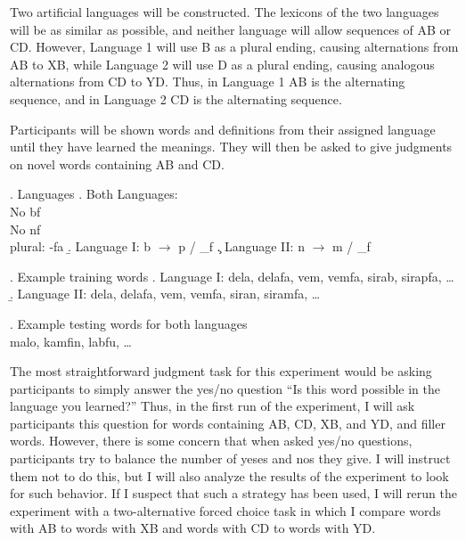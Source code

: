 Two artificial languages will be constructed. The lexicons of the two languages
will be as similar as possible, and neither language will allow sequences of AB
or CD. However, Language 1 will use B as a plural ending, causing alternations
from AB to XB, while Language 2 will use D as a plural ending, causing
analogous alternations from CD to YD.  Thus, in Language 1 AB is the
alternating sequence, and in Language 2 CD is the alternating sequence.

Participants will be shown words and definitions from their assigned language
until they have learned the meanings. They will then be asked to give judgments
on novel words containing AB and CD.

\ex. Languages
    \a. Both Languages:\\
    No bf\\
    No nf\\
    plural: -fa
    \b. Language I: b $\rightarrow$ p / \_f
    \c. Language II: n $\rightarrow$ m / \_f

\ex. Example training words
    \a. Language I: 
dela, delafa, vem, vemfa, sirab, sirapfa, \ldots
    \b. Language II:
dela, delafa, vem, vemfa, siran, siramfa, \ldots

\ex. Example testing words for both languages\\
malo, kamfin, labfu, \ldots













The most straightforward judgment task for this experiment would be asking participants
to simply answer the yes/no question ``Is this word possible in the language you learned?''
Thus, in the first run of the experiment, I will ask participants this question for words
containing AB, CD, XB, and YD, and filler words. However, there is some concern
that when asked yes/no questions, participants try to balance the number of yeses and nos
they give. I will instruct them not to do this, but I will also analyze the results of the
experiment to look for such behavior. If I suspect that such a strategy has been used, I
will rerun the experiment with a two-alternative forced choice task in which I compare
words with AB to words with XB and words with CD to words with YD.

